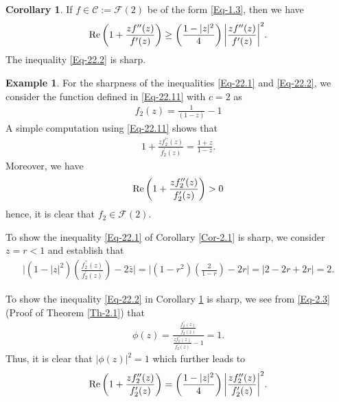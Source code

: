 \documentclass[a4paper,12pt]{amsart}
\theoremstyle{plain}
\theoremstyle{definition}
\newtheorem{exm}{Example}[section]
\newtheorem{cor}{Corollary}[section]
\theoremstyle{plain}
\begin{document}
\begin{cor}\label{Cor-2.2}
	If $f\in \mathcal{C} := \mathcal{F}(2)$ be of the form \eqref{Eq-1.3}, then we have
	\begin{align}\label{Eq-22.2}
		{\rm Re  }\left(1+\frac{zf^{\prime\prime}(z)}{f^{\prime}(z)}\right)\geq\left(\frac{1-|z|^2}{4}\right)\bigg|\frac{zf^{\prime\prime}(z)}{f^{\prime}(z)}\bigg|^2.
	\end{align}
	The inequality \eqref{Eq-22.2} is sharp. 
\end{cor}
\begin{exm}
	For the sharpness of the inequalities \eqref{Eq-22.1} and \eqref{Eq-22.2}, we consider the function defined in \eqref{Eq-22.11} with $c=2$ as 
	\begin{align*}
		f_2(z)=\frac{1}{(1-z)}-1
	\end{align*}
	A simple computation using \eqref{Eq-22.11} shows that
	\begin{align*}
		1+\frac{zf_2^{\prime\prime}(z)}{f_2^{\prime}(z)}=\frac{1+z}{1-z}.
	\end{align*}
	Moreover, we have 
	\begin{align*}
		{\rm 	Re}\left(1+\frac{zf_2^{\prime\prime}(z)}{f_2^{\prime}(z)}\right)>0
	\end{align*}
	hence, it is clear that $f_2\in\mathcal{F}(2)$.\vspace{2mm}
	
	To show the inequality \eqref{Eq-22.1} of Corollary \ref{Cor-2.1} is sharp, we consider $z=r<1$ and establish that 
	\begin{align*}
		\bigg|	(1-|z|^2)\left(\frac{f_2^{\prime\prime}(z)}{f_2^{\prime}(z)}\right)-2\bar{z}\bigg|=\bigg|	(1-r^2)\left(\frac{2}{1-r}\right)-2r\bigg|=|2-2r+2r|=2.
	\end{align*}
	
	\noindent To show the inequality \eqref{Eq-22.2} in Corollary \ref{Cor-2.2} is sharp, we see from \eqref{Eq-2.3} (Proof of Theorem \ref{Th-2.1}) that 
	\begin{align}\label{Eq-22.44}
		\phi(z)=\frac{\frac{f_2^{\prime\prime}(z)}{f_2^{\prime}(z)}}{\frac{zf_2^{\prime\prime}(z)}{f_2^{\prime}(z)}-1}=1.
	\end{align}
	Thus, it is clear that $|\phi(z)|^2=1$ which further leads to 
	\begin{align*}
		{\rm Re  }\left(1+\frac{zf_2^{\prime\prime}(z)}{f_2^{\prime}(z)}\right)=\left(\frac{1-|z|^2}{4}\right)\bigg|\frac{zf_2^{\prime\prime}(z)}{f_2^{\prime}(z)}\bigg|^2.
	\end{align*}
	
\end{exm}
\end{document}

